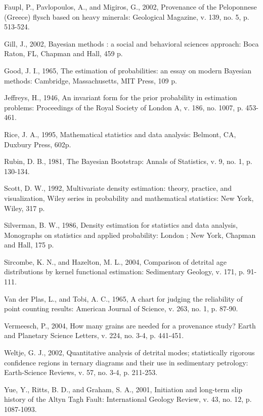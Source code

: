 \documentclass{article}
\begin{document}
\begin{description}
\item Faupl, P., Pavlopoulos, A., and Migiros, G., 2002, Provenance of
the Peloponnese  (Greece) flysch  based on heavy  minerals: Geological
Magazine, v. 139, no. 5, p. 513-524.

\item  Gill, J.,  2002, Bayesian  methods  : a  social and  behavioral
sciences approach: Boca Raton, FL, Chapman and Hall, 459 p.

\item Good, J. I., 1965,  The estimation of probabilities: an essay on
modern Bayesian methods: Cambridge, Massachusetts, MIT Press, 109 p.

\item Jeffreys, H., 1946, An  invariant form for the prior probability
in estimation problems: Proceedings of  the Royal Society of London A,
v. 186, no. 1007, p. 453-461.

\item Rice,  J. A., 1995,  Mathematical statistics and  data analysis:
Belmont, CA, Duxbury Press, 602p.

\item  Rubin,  D.   B.,   1981,  The  Bayesian  Bootstrap:  Annals  of
Statistics, v. 9, no. 1, p. 130-134.

\item Scott,  D.  W.,  1992, Multivariate density  estimation: theory,
practice,   and  visualization,  Wiley   series  in   probability  and
mathematical statistics: New York, Wiley, 317 p.

\item Silverman,  B. W., 1986,  Density estimation for  statistics and
data  analysis,  Monographs  on  statistics and  applied  probability:
London ; New York, Chapman and Hall, 175 p.

\item  Sircombe, K.  N.,  and  Hazelton, M.  L.,  2004, Comparison  of
detrital   age   distributions   by  kernel   functional   estimation:
Sedimentary Geology, v. 171, p. 91-111.

\item Van der Plas, L., and Tobi, A. C., 1965, A chart for judging the
reliability of  point counting  results: American Journal  of Science,
v. 263, no. 1, p. 87-90.

\item Vermeesch, P., 2004, How many grains are needed for a provenance
study?   Earth  and Planetary  Science  Letters,  v.   224, no.   3-4,
p. 441-451.

\item Weltje,  G. J., 2002,  Quantitative analysis of  detrital modes;
statistically  rigorous  confidence regions  in  ternary diagrams  and
their  use in  sedimentary  petrology: Earth-Science  Reviews, v.  57,
no. 3-4, p. 211-253.

\item Yue, Y.,  Ritts, B. D., and Graham, S.  A., 2001, Initiation and
long-term slip history of  the Altyn Tagh Fault: International Geology
Review, v. 43, no. 12, p. 1087-1093.

\end{description}
\end{document}
